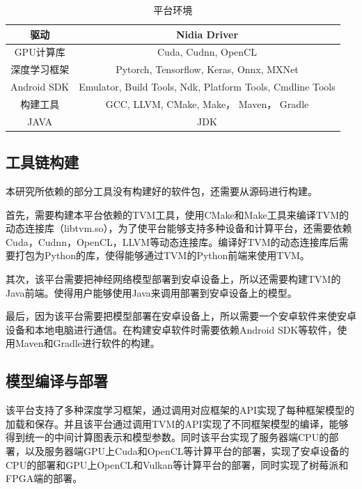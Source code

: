 \begin{table}
    \centering
    \caption{平台环境}
    \label{base_environment}
    \begin{tabular}{c||c}
        \hline
        驱动         & Nidia Driver \\ \hline
        GPU计算库    & Cuda, Cudnn, OpenCL \\ \hline
        深度学习框架  & Pytorch, Tensorflow, Keras, Onnx, MXNet \\ \hline
        Android SDK & Emulator, Build Tools, Ndk, Platform Tools, Cmdline Tools \\ \hline
        构建工具     & GCC, LLVM, CMake, Make， Maven， Gradle \\ \hline
        JAVA        & JDK \\ \hline
    \end{tabular}
\end{table}


\subsection{工具链构建}

本研究所依赖的部分工具没有构建好的软件包，还需要从源码进行构建。

首先，需要构建本平台依赖的TVM工具，使用CMake和Make工具来编译TVM的动态连接库（libtvm.so），为了使平台能够支持多种设备和计算平台，还需要依赖Cuda，Cudnn，OpenCL，LLVM等动态连接库。编译好TVM的动态连接库后需要打包为Python的库，使得能够通过TVM的Python前端来使用TVM。

其次，该平台需要把神经网络模型部署到安卓设备上，所以还需要构建TVM的Java前端。使得用户能够使用Java来调用部署到安卓设备上的模型。

最后，因为该平台需要把模型部署在安卓设备上，所以需要一个安卓软件来使安卓设备和本地电脑进行通信。在构建安卓软件时需要依赖Android SDK等软件，使用Maven和Gradle进行软件的构建。

\subsection{模型编译与部署}

该平台支持了多种深度学习框架，通过调用对应框架的API实现了每种框架模型的加载和保存。并且该平台通过调用TVM的API实现了不同框架模型的编译，能够得到统一的中间计算图表示和模型参数。同时该平台实现了服务器端CPU的部署，以及服务器端GPU上Cuda和OpenCL等计算平台的部署，实现了安卓设备的CPU的部署和GPU上OpenCL和Vulkan等计算平台的部署，同时实现了树莓派和FPGA端的部署。

